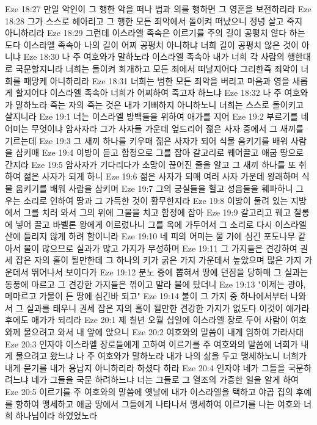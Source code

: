 Eze 18:27  만일 악인이 그 행한 악을 떠나 법과 의를 행하면 그 영혼을 보전하리라
Eze 18:28  그가 스스로 헤아리고 그 행한 모든 죄악에서 돌이켜 떠났으니 정녕 살고 죽지 아니하리라
Eze 18:29  그런데 이스라엘 족속은 이르기를 주의 길이 공평치 않다 하는도다 이스라엘 족속아 나의 길이 어찌 공평치 아니하냐 너희 길이 공평치 않은 것이 아니냐
Eze 18:30  나 주 여호와가 말하노라 이스라엘 족속아 내가 너희 각 사람의 행한대로 국문할지니라 너희는 돌이켜 회개하고 모든 죄에서 떠날지어다 그리한즉 죄악이 너희를 패망케 아니하리라
Eze 18:31  너희는 범한 모든 죄악을 버리고 마음과 영을 새롭게 할지어다 이스라엘 족속아 너희가 어찌하여 죽고자 하느냐
Eze 18:32  나 주 여호와가 말하노라 죽는 자의 죽는 것은 내가 기뻐하지 아니하노니 너희는 스스로 돌이키고 살지니라
Eze 19:1  너는 이스라엘 방백들을 위하여 애가를 지어
Eze 19:2  부르기를 네 어미는 무엇이냐 암사자라 그가 사자들 가운데 엎드리어 젊은 사자 중에서 그 새끼를 기르는데
Eze 19:3  그 새끼 하나를 키우매 젊은 사자가 되어 식물 움키기를 배워 사람을 삼키매
Eze 19:4  이방이 듣고 함정으로 그를 잡아 갈고리로 꿰어끌고 애굽 땅으로 간지라
Eze 19:5  암사자가 기다리다가 소망이 끊어진 줄을 알고 그 새끼 하나를 또 취하여 젊은 사자가 되게 하니
Eze 19:6  젊은 사자가 되매 여러 사자 가운데 왕래하며 식물 움키기를 배워 사람을 삼키며
Eze 19:7  그의 궁실들을 헐고 성읍들을 훼파하니 그 우는 소리로 인하여 땅과 그 가득한 것이 황무한지라
Eze 19:8  이방이 둘려 있는 지방에서 그를 치러 와서 그의 위에 그물을 치고 함정에 잡아
Eze 19:9  갈고리고 꿰고 철롱에 넣어 끌고 바벨론 왕에게 이르렀나니 그를 옥에 가두어서 그 소리로 다시 이스라엘 산에 들리지 않게 하려 함이니라
Eze 19:10  네 피의 어미는 물 가에 심긴 포도나무 같아서 물이 많으므로 실과가 많고 가지가 무성하며
Eze 19:11  그 가지들은 견강하여 권세 잡은 자의 홀이 될만한데 그 하나의 키가 굵은 가지 가운데서 높았으며 많은 가지 가운데서 뛰어나서 보이다가
Eze 19:12  분노 중에 뽑혀서 땅에 던짐을 당하매 그 실과는 동풍에 마르고 그 견강한 가지들은 꺾이고 말라 불에 탔더니
Eze 19:13  "이제는 광야, 메마르고 가물이 든 땅에 심긴바 되고"
Eze 19:14  불이 그 가지 중 하나에서부터 나와서 그 실과를 태우니 권세 잡은 자의 홀이 될만한 견강한 가지가 없도다 이것이 애가라 후에도 애가가 되리라
Eze 20:1  제 칠년 오월 십일에 이스라엘 장로 두어 사람이 여호와께 물으려고 와서 내 앞에 앉으니
Eze 20:2  여호와의 말씀이 내게 임하여 가라사대
Eze 20:3  인자야 이스라엘 장로들에게 고하여 이르기를 주 여호와의 말씀에 너희가 내게 물으려고 왔느냐 나 주 여호와가 말하노라 내가 나의 삶을 두고 맹세하노니 너희가 내게 묻기를 내가 용납지 아니하리라 하셨다 하라
Eze 20:4  인자야 네가 그들을 국문하려느냐 네가 그들을 국문 하려하느냐 너는 그들로 그 열조의 가증한 일을 알게 하여
Eze 20:5  이르기를 주 여호와의 말씀에 옛날에 내가 이스라엘을 택하고 야곱 집의 후예를 향하여 맹세하고 애굽 땅에서 그들에게 나타나서 맹세하여 이르기를 나는 여호와 너희 하나님이라 하였었노라
